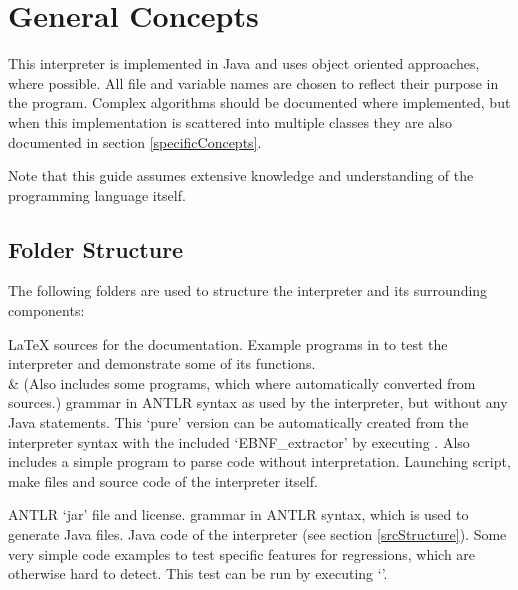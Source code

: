 \section{General Concepts}

This interpreter is implemented in Java and uses object oriented approaches, where possible. All file and variable names are chosen to reflect their purpose in the program. Complex algorithms should be documented where implemented, but when this implementation is scattered into multiple classes they are also documented in section \ref{specificConcepts}.

Note that this guide assumes extensive knowledge and understanding of the \SetlX{} programming language itself.

\subsection{Folder Structure}

The following folders are used to structure the interpreter and its surrounding components:

\begin{itemize}
			{\LaTeX{} sources for the documentation.}
			{Example programs in \SetlX{} to test the interpreter and demonstrate some of its functions.\\&
			 (Also includes some programs, which where automatically converted from \SetlTwo{} sources.)}
			{\SetlX{} grammar in ANTLR syntax as used by the interpreter, but without any Java statements. This `pure' version can be automatically created from the interpreter syntax with the included `EBNF\_extractor' by executing . Also includes a simple program to parse \SetlX{} code without interpretation.}
			{Launching script, make files and source code of the interpreter itself.}
	\begin{itemize}
				{ANTLR `jar' file and license.}
				{\SetlX{} grammar in ANTLR syntax, which is used to generate Java files.}
				{Java code of the interpreter (see section \ref{srcStructure}).}
				{Some very simple \SetlX{} code examples to test specific features for regressions, which are otherwise hard to detect. This test can be run by executing `'.}
	\end{itemize}
\end{itemize}

